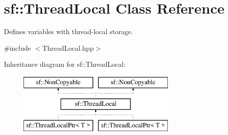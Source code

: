 \hypertarget{classsf_1_1_thread_local}{\section{sf\-:\-:Thread\-Local Class Reference}
\label{classsf_1_1_thread_local}
}


Defines variables with thread-\/local storage.  




{\ttfamily \#include $<$Thread\-Local.\-hpp$>$}

Inheritance diagram for sf\-:\-:Thread\-Local\-:\begin{figure}[H]
\begin{center}
\leavevmode
\includegraphics[height=3.000000cm]{classsf_1_1_thread_local}
\end{center}
\end{figure}
